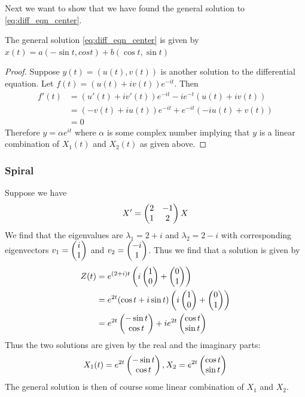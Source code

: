 Next we want to show that we have found the general solution to \autoref{eq:diff_eqn_center}.
\begin{lemma}
    The general solution \autoref{eq:diff_eqn_center} is given by $x(t) = a (-\sin t, cos t) + b(\cos t, \sin t)$
\end{lemma}
\begin{proof}
    Suppose $y(t) = (u(t), v(t))$ is another solution to the differential equation. Let $f(t) = (u(t) + iv(t))e^{-it}$. Then
    \begin{align*}
        f'(t) &= (u'(t) + i v'(t)) e^{-it} - ie^{-t} (u(t) + i v(t))\\
        &= (-v(t) + i u(t)) e^{-it} + e^{-it}(-i u(t) + v(t))\\
        &= 0
    \end{align*}
    Therefore $y = \alpha e^{it}$ where $\alpha$ is some complex number implying that $y$ is a linear combination of $X_1(t)$ and $X_2(t)$ as given above.
\end{proof}

\subsubsection{Spiral}
Suppose we have
\begin{equation}\label{eq:spiral}
    X' = \begin{pmatrix} 2 & -1\\1 & 2 \end{pmatrix} X
\end{equation}
We find that the eigenvalues are $\lambda_1 = 2 + i$ and $\lambda_2 = 2 - i$ with corresponding eigenvectors $v_1 = \begin{pmatrix} i \\ 1 \end{pmatrix}$ and $v_2 = \begin{pmatrix} -i \\ 1 \end{pmatrix}$. Thus we find that a solution is given by
\begin{align*}
    Z(t) &= e^{(2 + i)t} \left( i \begin{pmatrix} 1\\0 \end{pmatrix} + \begin{pmatrix} 0\\1 \end{pmatrix}\right)\\
    &= e^{2t} (\cos t + i \sin t) \left( i \begin{pmatrix} 1\\0 \end{pmatrix} + \begin{pmatrix} 0\\1 \end{pmatrix}\right)\\
    &= e^{2t} \begin{pmatrix} -\sin t \\ \cos t \end{pmatrix} + i e^{2t} \begin{pmatrix} \cos t \\ \sin t \end{pmatrix}
\end{align*}
Thus the two solutions are given by the real and the imaginary parts:
$$ X_1(t) = e^{2t} \begin{pmatrix} -\sin t \\ \cos t \end{pmatrix}, X_2 =  e^{2t} \begin{pmatrix} \cos t \\ \sin t \end{pmatrix}$$
The general solution is then of course some linear combination of $X_1$ and $X_2$.

